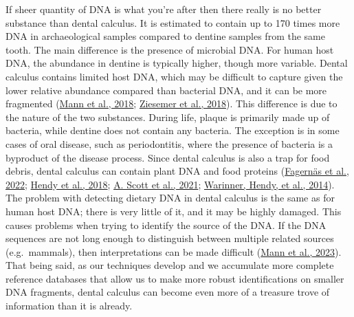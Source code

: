 \documentclass[
  letterpaper,
]{book}
\begin{document}
If sheer quantity of DNA is what you're after then there really is no
better substance than dental calculus. It is estimated to contain up to
170 times more DNA in archaeological samples compared to dentine samples
from the same tooth. The main difference is the presence of microbial
DNA. For human host DNA, the abundance in dentine is typically higher,
though more variable. Dental calculus contains limited host DNA, which
may be difficult to capture given the lower relative abundance compared
than bacterial DNA, and it can be more fragmented
(\protect\hyperlink{ref-mannDifferentialPreservation2018}{Mann et al.,
2018}; \protect\hyperlink{ref-ziesemerGenomeCalculus2018}{Ziesemer et
al., 2018}). This difference is due to the nature of the two substances.
During life, plaque is primarily made up of bacteria, while dentine does
not contain any bacteria. The exception is in some cases of oral
disease, such as periodontitis, where the presence of bacteria is a
byproduct of the disease process. Since dental calculus is also a trap
for food debris, dental calculus can contain plant DNA and food proteins
(\protect\hyperlink{ref-fagernasMicrobialBiogeography2022}{Fagernäs et
al., 2022}; \protect\hyperlink{ref-hendyProteomicCalculus2018}{Hendy et
al., 2018}; \protect\hyperlink{ref-scottExoticFoods2021}{A. Scott et
al., 2021}; \protect\hyperlink{ref-warinnerEvidenceMilk2014}{Warinner,
Hendy, et al., 2014}). The problem with detecting dietary DNA in dental
calculus is the same as for human host DNA; there is very little of it,
and it may be highly damaged. This causes problems when trying to
identify the source of the DNA. If the DNA sequences are not long enough
to distinguish between multiple related sources (e.g.~mammals), then
interpretations can be made difficult
(\protect\hyperlink{ref-mannHaveSomething2023}{Mann et al., 2023}). That
being said, as our techniques develop and we accumulate more complete
reference databases that allow us to make more robust identifications on
smaller DNA fragments, dental calculus can become even more of a
treasure trove of information than it is already.
\end{document}
